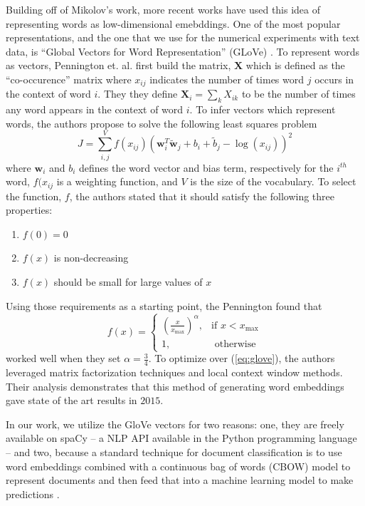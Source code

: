 \documentclass[../thesis.tex]{subfiles}
\begin{document}
Building off of Mikolov's work, more recent works have used this idea of representing words as low-dimensional emebddings. One of the most popular representations, and the one that we use for the numerical experiments with text data, is ``Global Vectors for Word Representation'' (GLoVe) \cite{pennington2014glove}. To represent words as vectors, Pennington et. al. first build the matrix, $\mathbf{X}$ which is defined as the ``co-occurence'' matrix where $x_{ij}$ indicates the number of times word $j$ occurs in the context of word $i$. They they define $\mathbf{X}_i = \sum_k X_{ik}$ to be the number of times any word appears in the context of word $i$. To infer vectors which represent words, the authors propose to solve the following least squares problem
\begin{equation}
    \label{eq:glove}
    J = \sum_{i, j}^V f(x_{ij})\left(\mathbf{w}_i^T \tilde{\mathbf{w}}_j + b_i + \tilde{b}_j - \log\left(x_{ij}\right) \right)^2
\end{equation}
where $\mathbf{w}_i$ and $b_i$ defines the word vector and bias term, respectively for the $i^{th}$ word, $f(x_{ij}$ is a weighting function, and $V$ is the size of the vocabulary. To select the function, $f$, the authors stated that it should satisfy the following three properties:
\begin{enumerate}
    \item $f(0) = 0$
    \item $f(x)$ is non-decreasing
    \item $f(x)$ should be small for large values of $x$
\end{enumerate}
Using those requirements as a starting point, the Pennington found that
\begin{equation}
    \label{eq:glove_function}
    f(x) = 
    \begin{cases}
        \left(\frac{x}{x_{\text{max}}}\right)^\alpha, &\text{if } x < x_{\text{max}} \\
        1, &\text{ otherwise}
    \end{cases}
\end{equation}
worked well when they set $\alpha = \frac{3}{4}$. To optimize over (\ref{eq:glove}), the authors leveraged matrix factorization techniques and local context window methods. Their analysis demonstrates that this method of generating word embeddings gave state of the art results in $2015$. 

In our work, we utilize the GloVe vectors for two reasons: one, they are freely available on spaCy -- a NLP API available in the Python programming language -- and two, because a standard technique for document classification is to use word embeddings combined with a continuous bag of words (CBOW) model to represent documents and then feed that into a machine learning model to make predictions \cite{mikolov2013efficient}.
\end{document}
